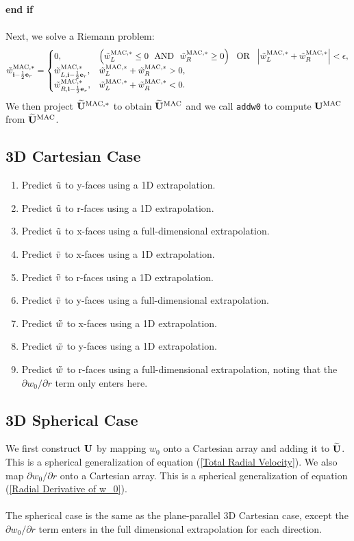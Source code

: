 {\bf end if}\\ \\
Next, we solve a Riemann problem:
\begin{equation}
\tilde{w}_{{\bf i}-\frac{1}{2}{\bf e}_r}^{\rm MAC,*} =
\begin{cases}
0, & \left(\tilde{w}_L^{\rm MAC,*} \le 0 ~~ {\rm AND} ~~ \tilde{w}_R^{\rm MAC,*} \ge 0\right) ~~ {\rm OR} ~~ \left|\tilde{w}_L^{\rm MAC,*} + \tilde{w}_R^{\rm MAC,*}\right| < \epsilon, \\
\tilde{w}_{L,{\bf i}-\frac{1}{2}{\bf e}_r}^{\rm MAC,*}, & \tilde{w}_L^{\rm MAC,*} + \tilde{w}_R^{\rm MAC,*} > 0, \\
\tilde{w}_{R,{\bf i}-\frac{1}{2}{\bf e}_r}^{\rm MAC,*}, & \tilde{w}_L^{\rm MAC,*} + \tilde{w}_R^{\rm MAC,*} < 0. 
\end{cases}
\end{equation}
We then project $\widetilde{{\bf U}}^{\rm MAC,*}$ to obtain $\widetilde{{\bf U}}^{\rm MAC}$ and we call
{\tt addw0} to compute ${\bf U}^{\rm MAC}$ from $\widetilde{{\bf U}}^{\rm MAC}$.
\subsection{3D Cartesian Case}
\begin{enumerate}
\item Predict $\tilde{u}$ to y-faces using a 1D extrapolation.
\item Predict $\tilde{u}$ to r-faces using a 1D extrapolation.
\item Predict $\tilde{u}$ to x-faces using a full-dimensional extrapolation.
\item Predict $\tilde{v}$ to x-faces using a 1D extrapolation.
\item Predict $\tilde{v}$ to r-faces using a 1D extrapolation.
\item Predict $\tilde{v}$ to y-faces using a full-dimensional extrapolation.
\item Predict $\tilde{w}$ to x-faces using a 1D extrapolation.
\item Predict $\tilde{w}$ to y-faces using a 1D extrapolation.
\item Predict $\tilde{w}$ to r-faces using a full-dimensional extrapolation, 
  noting that the $\partial w_0/\partial r$ term only enters here.
\end{enumerate}
\subsection{3D Spherical Case}
We first construct ${\bf U}$ by mapping $w_0$ onto a Cartesian array and
adding it to $\widetilde{{\bf U}}$.  This is a spherical generalization of equation
(\ref{Total Radial Velocity}).  We also map $\partial w_0/\partial r$
onto a Cartesian array.  This is a spherical generalization of
equation (\ref{Radial Derivative of w_0}).\\ \\
The spherical case is the same as the plane-parallel 3D Cartesian 
case, except the $\partial w_0/\partial r$ term enters 
in the full dimensional extrapolation for each direction.

